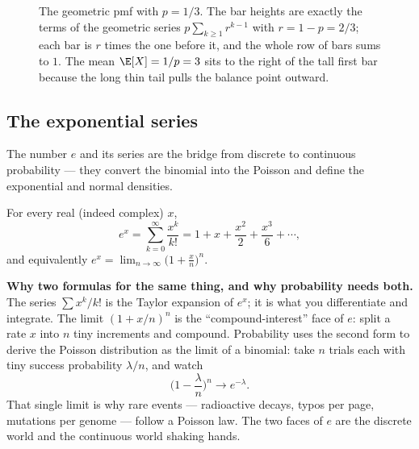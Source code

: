 \begin{figure}[H]
\centering
{}
\caption{The geometric pmf with $p=1/3$. The bar heights are exactly the terms
of the geometric series $p\sum_{k\ge 1} r^{k-1}$ with $r=1-p=2/3$; each bar is
$r$ times the one before it, and the whole row of bars sums to $1$. The mean
$\E[X]=1/p=3$ sits to the right of the tall first bar because the long thin
tail pulls the balance point outward.}
\label{ch39:geompmf}
\end{figure}

\subsection{The exponential series}

The number $e$ and its series are the bridge from discrete to continuous
probability --- they convert the binomial into the Poisson and define the
exponential and normal densities.

\begin{proposition}
\label{ch39:exp}
For every real (indeed complex) $x$,
\[
  e^{x} = \sum_{k=0}^{\infty} \frac{x^{k}}{k!}
  = 1 + x + \frac{x^2}{2} + \frac{x^3}{6} + \cdots,
\]
and equivalently $\displaystyle e^{x} = \lim_{n\to\infty}\Big(1 +
\frac{x}{n}\Big)^{n}$.
\end{proposition}

\begin{happeningbox}
\textbf{Why two formulas for the same thing, and why probability needs both.}
The series $\sum x^k/k!$ is the Taylor expansion of $e^x$; it is what you
differentiate and integrate. The limit $(1+x/n)^n$ is the
``compound-interest'' face of $e$: split a rate $x$ into $n$ tiny increments
and compound. Probability uses the second form to derive the Poisson
distribution as the limit of a binomial: take $n$ trials each with tiny
success probability $\lambda/n$, and watch
\[
  \Big(1 - \frac{\lambda}{n}\Big)^{n} \longrightarrow e^{-\lambda}.
\]
That single limit is why rare events --- radioactive decays, typos per page,
mutations per genome --- follow a Poisson law. The two faces of $e$ are the
discrete world and the continuous world shaking hands.
\end{happeningbox}

